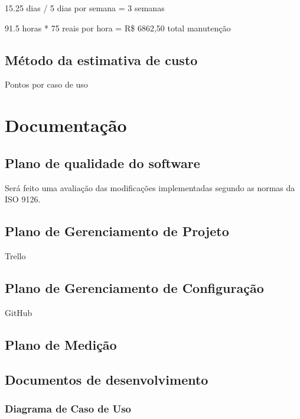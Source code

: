 15.25 dias / 5 dias por semana =  3 semanas

91.5 horas *  75 reais por hora = R\$ 6862,50 total manutenção

\subsection{Método da estimativa de custo}

Pontos por caso de uso

\section{Documentação}

\subsection{Plano de qualidade do software}
	Será feito uma avaliação das modificações implementadas segundo as normas da ISO 9126.
\subsection{Plano de Gerenciamento de Projeto}

Trello

\subsection{Plano de Gerenciamento de Configuração}

GitHub

\subsection{Plano de Medição}

\subsection{Documentos de desenvolvimento}

\subsubsection{Diagrama de Caso de Uso}

